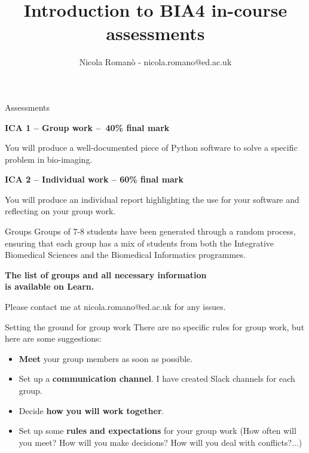 \documentclass[9pt, aspectratio=169]{beamer}
\author{Nicola Roman\`o - nicola.romano@ed.ac.uk}
\title{Introduction to BIA4 in-course assessments}
\date{}
\begin{document}

\begin{frame}
    \titlepage
\end{frame}

\begin{frame}
    {Assessments}

    \textbf{ICA 1 – Group work – 40\% final mark}

    You will produce a well-documented piece of Python software to solve a specific problem in bio-imaging.

    \textbf{ICA 2 – Individual work – 60\% final mark}

    You will produce an individual report highlighting the use for your software and reflecting on your group work.
\end{frame}

\begin{frame}
    {Groups}
    Groups of 7-8 students have been generated through a random process, ensuring that each group has a mix of students from both the Integrative Biomedical Sciences and the Biomedical Informatics programmes.

    \centering
    \Large
    \textbf{The list of groups and all necessary information\\
        is available on Learn.}

    \normalsize
    Please contact me at nicola.romano@ed.ac.uk for any issues.

\end{frame}

\begin{frame}
    {Setting the ground for group work}
    There are no specific rules for group work, but here are some suggestions:

    \begin{itemize}[<+->]
        \item \textbf{Meet} your group members as soon as possible.
        \item Set up a \textbf{communication channel}. I have created Slack channels for each group.
        \item Decide \textbf{how you will work together}.
        \item Set up some \textbf{rules and expectations} for your group work (How often will you meet? How will you make decisions? How will you deal with conflicts?...)
    \end{itemize}
\end{frame}
\end{document}
